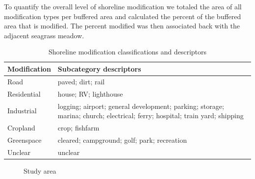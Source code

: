 \documentclass[12pt]{article}\usepackage[]{graphicx}\usepackage[]{color}
\begin{document}
To quantify the overall level of shoreline modification we totaled the area of all modification types per buffered area and calculated the percent of the buffered area that is modified. The percent modified was then associated back with the adjacent seagrass meadow.
\begin{table}[h]

\caption{\label{tab:modifications}Shoreline modification classifications and descriptors}
\centering
\fontsize{9}{11}\selectfont
\begin{tabular}[t]{>{\centering\arraybackslash}m{10em}>{\raggedright\arraybackslash}m{30em}}
\toprule
\textbf{Modification} & \textbf{Subcategory descriptors}\\
\midrule
Road & paved; dirt; rail\\
\addlinespace
Residential & house; RV; lighthouse\\
\addlinespace
Industrial & logging; airport; general development; parking; storage; marina; church; electrical; ferry; hospital; train yard; shipping\\
\addlinespace
Cropland & crop; fishfarm\\
\addlinespace
Greenspace & cleared; campground; golf; park; recreation\\
\addlinespace
Unclear & unclear\\
\bottomrule
\end{tabular}
\end{table}
\begin{figure}[H]

{\centering {} 

}

\caption{Study area}\label{fig:studyareafig}
\end{figure}
\end{document}
